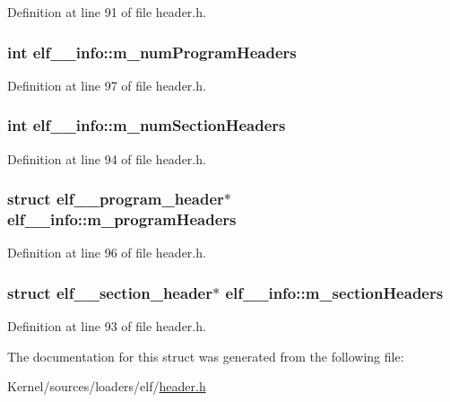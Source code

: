 Definition at line 91 of file header.h.

\hypertarget{structelf__32__info_a3d0840d804c71febb4e372812f9f5b3e}{
\subsubsection[{m\_\-numProgramHeaders}]{\setlength{\rightskip}{0pt plus 5cm}int {\bf elf\_\_\-info::m\_\-numProgramHeaders}}}
\label{structelf__32__info_a3d0840d804c71febb4e372812f9f5b3e}


Definition at line 97 of file header.h.

\hypertarget{structelf__32__info_a701e263cc9e77c5e031b01faef03ed79}{
\subsubsection[{m\_\-numSectionHeaders}]{\setlength{\rightskip}{0pt plus 5cm}int {\bf elf\_\_\-info::m\_\-numSectionHeaders}}}
\label{structelf__32__info_a701e263cc9e77c5e031b01faef03ed79}


Definition at line 94 of file header.h.

\hypertarget{structelf__32__info_a26df4e771f5978aa40f2ddef21370e4b}{
\subsubsection[{m\_\-programHeaders}]{\setlength{\rightskip}{0pt plus 5cm}struct {\bf elf\_\_\-program\_\-header}$\ast$ {\bf elf\_\_\-info::m\_\-programHeaders}}}
\label{structelf__32__info_a26df4e771f5978aa40f2ddef21370e4b}


Definition at line 96 of file header.h.

\hypertarget{structelf__32__info_ab8d46ddc9a0d9ba619b7ab8d296e8b52}{
\subsubsection[{m\_\-sectionHeaders}]{\setlength{\rightskip}{0pt plus 5cm}struct {\bf elf\_\_\-section\_\-header}$\ast$ {\bf elf\_\_\-info::m\_\-sectionHeaders}}}
\label{structelf__32__info_ab8d46ddc9a0d9ba619b7ab8d296e8b52}


Definition at line 93 of file header.h.



The documentation for this struct was generated from the following file:\begin{DoxyCompactItemize}
\item 
Kernel/sources/loaders/elf/\hyperlink{header_8h}{header.h}\end{DoxyCompactItemize}
